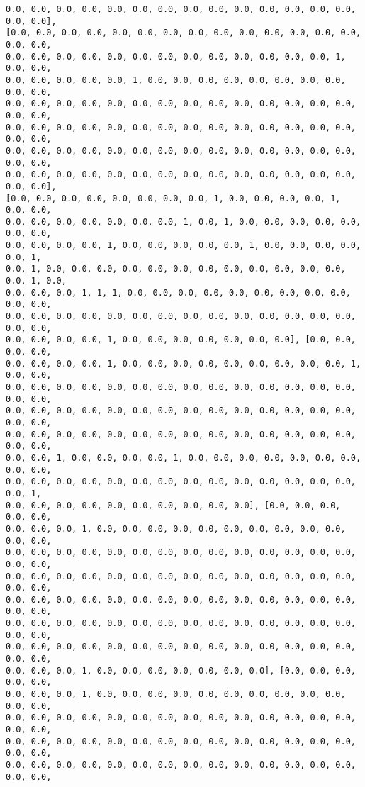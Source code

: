\documentclass[11pt]{article}
\begin{document}
\begin{Verbatim}[commandchars=\\\{\}]
0.0, 0.0, 0.0, 0.0, 0.0, 0.0, 0.0, 0.0, 0.0, 0.0, 0.0, 0.0, 0.0, 0.0, 0.0, 0.0],
[0.0, 0.0, 0.0, 0.0, 0.0, 0.0, 0.0, 0.0, 0.0, 0.0, 0.0, 0.0, 0.0, 0.0, 0.0, 0.0,
0.0, 0.0, 0.0, 0.0, 0.0, 0.0, 0.0, 0.0, 0.0, 0.0, 0.0, 0.0, 0.0, 1, 0.0, 0.0,
0.0, 0.0, 0.0, 0.0, 0.0, 1, 0.0, 0.0, 0.0, 0.0, 0.0, 0.0, 0.0, 0.0, 0.0, 0.0,
0.0, 0.0, 0.0, 0.0, 0.0, 0.0, 0.0, 0.0, 0.0, 0.0, 0.0, 0.0, 0.0, 0.0, 0.0, 0.0,
0.0, 0.0, 0.0, 0.0, 0.0, 0.0, 0.0, 0.0, 0.0, 0.0, 0.0, 0.0, 0.0, 0.0, 0.0, 0.0,
0.0, 0.0, 0.0, 0.0, 0.0, 0.0, 0.0, 0.0, 0.0, 0.0, 0.0, 0.0, 0.0, 0.0, 0.0, 0.0,
0.0, 0.0, 0.0, 0.0, 0.0, 0.0, 0.0, 0.0, 0.0, 0.0, 0.0, 0.0, 0.0, 0.0, 0.0, 0.0],
[0.0, 0.0, 0.0, 0.0, 0.0, 0.0, 0.0, 0.0, 1, 0.0, 0.0, 0.0, 0.0, 1, 0.0, 0.0,
0.0, 0.0, 0.0, 0.0, 0.0, 0.0, 0.0, 1, 0.0, 1, 0.0, 0.0, 0.0, 0.0, 0.0, 0.0, 0.0,
0.0, 0.0, 0.0, 0.0, 1, 0.0, 0.0, 0.0, 0.0, 0.0, 1, 0.0, 0.0, 0.0, 0.0, 0.0, 1,
0.0, 1, 0.0, 0.0, 0.0, 0.0, 0.0, 0.0, 0.0, 0.0, 0.0, 0.0, 0.0, 0.0, 0.0, 1, 0.0,
0.0, 0.0, 0.0, 1, 1, 1, 0.0, 0.0, 0.0, 0.0, 0.0, 0.0, 0.0, 0.0, 0.0, 0.0, 0.0,
0.0, 0.0, 0.0, 0.0, 0.0, 0.0, 0.0, 0.0, 0.0, 0.0, 0.0, 0.0, 0.0, 0.0, 0.0, 0.0,
0.0, 0.0, 0.0, 0.0, 1, 0.0, 0.0, 0.0, 0.0, 0.0, 0.0, 0.0], [0.0, 0.0, 0.0, 0.0,
0.0, 0.0, 0.0, 0.0, 1, 0.0, 0.0, 0.0, 0.0, 0.0, 0.0, 0.0, 0.0, 0.0, 1, 0.0, 0.0,
0.0, 0.0, 0.0, 0.0, 0.0, 0.0, 0.0, 0.0, 0.0, 0.0, 0.0, 0.0, 0.0, 0.0, 0.0, 0.0,
0.0, 0.0, 0.0, 0.0, 0.0, 0.0, 0.0, 0.0, 0.0, 0.0, 0.0, 0.0, 0.0, 0.0, 0.0, 0.0,
0.0, 0.0, 0.0, 0.0, 0.0, 0.0, 0.0, 0.0, 0.0, 0.0, 0.0, 0.0, 0.0, 0.0, 0.0, 0.0,
0.0, 0.0, 1, 0.0, 0.0, 0.0, 0.0, 1, 0.0, 0.0, 0.0, 0.0, 0.0, 0.0, 0.0, 0.0, 0.0,
0.0, 0.0, 0.0, 0.0, 0.0, 0.0, 0.0, 0.0, 0.0, 0.0, 0.0, 0.0, 0.0, 0.0, 0.0, 1,
0.0, 0.0, 0.0, 0.0, 0.0, 0.0, 0.0, 0.0, 0.0, 0.0], [0.0, 0.0, 0.0, 0.0, 0.0,
0.0, 0.0, 0.0, 1, 0.0, 0.0, 0.0, 0.0, 0.0, 0.0, 0.0, 0.0, 0.0, 0.0, 0.0, 0.0,
0.0, 0.0, 0.0, 0.0, 0.0, 0.0, 0.0, 0.0, 0.0, 0.0, 0.0, 0.0, 0.0, 0.0, 0.0, 0.0,
0.0, 0.0, 0.0, 0.0, 0.0, 0.0, 0.0, 0.0, 0.0, 0.0, 0.0, 0.0, 0.0, 0.0, 0.0, 0.0,
0.0, 0.0, 0.0, 0.0, 0.0, 0.0, 0.0, 0.0, 0.0, 0.0, 0.0, 0.0, 0.0, 0.0, 0.0, 0.0,
0.0, 0.0, 0.0, 0.0, 0.0, 0.0, 0.0, 0.0, 0.0, 0.0, 0.0, 0.0, 0.0, 0.0, 0.0, 0.0,
0.0, 0.0, 0.0, 0.0, 0.0, 0.0, 0.0, 0.0, 0.0, 0.0, 0.0, 0.0, 0.0, 0.0, 0.0, 0.0,
0.0, 0.0, 0.0, 1, 0.0, 0.0, 0.0, 0.0, 0.0, 0.0, 0.0], [0.0, 0.0, 0.0, 0.0, 0.0,
0.0, 0.0, 0.0, 1, 0.0, 0.0, 0.0, 0.0, 0.0, 0.0, 0.0, 0.0, 0.0, 0.0, 0.0, 0.0,
0.0, 0.0, 0.0, 0.0, 0.0, 0.0, 0.0, 0.0, 0.0, 0.0, 0.0, 0.0, 0.0, 0.0, 0.0, 0.0,
0.0, 0.0, 0.0, 0.0, 0.0, 0.0, 0.0, 0.0, 0.0, 0.0, 0.0, 0.0, 0.0, 0.0, 0.0, 0.0,
0.0, 0.0, 0.0, 0.0, 0.0, 0.0, 0.0, 0.0, 0.0, 0.0, 0.0, 0.0, 0.0, 0.0, 0.0, 0.0,

\end{Verbatim}
\end{document}
